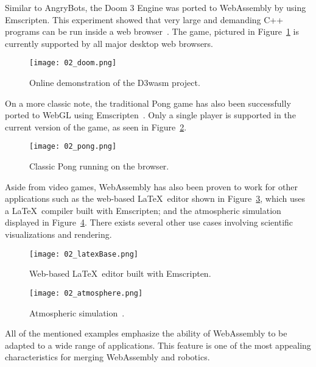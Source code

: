         Similar to AngryBots, the Doom 3 Engine was ported to WebAssembly by using Emscripten. This experiment showed that very large and demanding C++ programs can be run inside a web browser~\cite{doom3}. The game, pictured in Figure~\ref{fig:doom} is currently supported by all major desktop web browsers.

        \begin{figure}[htbp]
            \centering
            \texttt{[image: 02\_doom.png]}
            \caption{Online demonstration of the \ac{D3wasm} project.}
            \label{fig:doom}
        \end{figure}

        On a more classic note, the traditional Pong game has also been successfully ported to WebGL using Emscripten~\cite{pong}. Only a single player is supported in the current version of the game, as seen in Figure~\ref{fig:pong}. 

        \begin{figure}[htbp]
            \centering
            \texttt{[image: 02\_pong.png]}
            \caption{Classic Pong running on the browser.}
            \label{fig:pong}
        \end{figure}

        Aside from video games, WebAssembly has also been proven to work for other applications such as the web-based \LaTeX\ editor shown in Figure~\ref{fig:latex}, which uses a \LaTeX\ compiler built with Emscripten; and the atmospheric simulation displayed in Figure~\ref{fig:atmos}. There exists several other use cases involving scientific visualizations and rendering. 

        \begin{figure}[htbp]
            \centering
            \texttt{[image: 02\_latexBase.png]}
            \caption{Web-based \LaTeX\ editor built with Emscripten.}
            \label{fig:latex}
        \end{figure}



        \begin{figure}[htbp]
            \centering
            \texttt{[image: 02\_atmosphere.png]}
            \caption{Atmospheric simulation~\cite{atmos}.}
            \label{fig:atmos}
        \end{figure}

        All of the mentioned examples emphasize the ability of WebAssembly to be adapted to a wide range of applications. This feature is one of the most appealing characteristics for merging WebAssembly and robotics.


